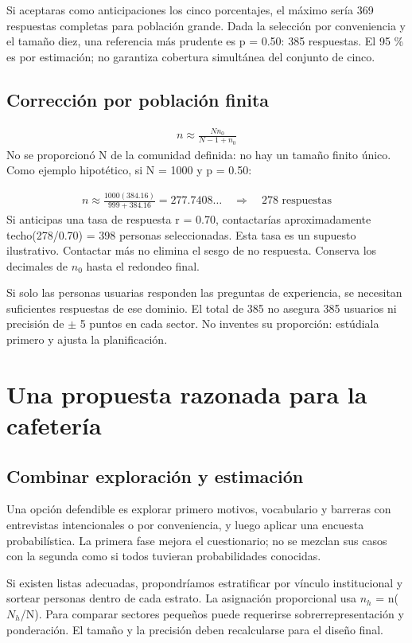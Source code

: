 \documentclass[11pt,letterpaper]{article}
\begin{document}
Si aceptaras como anticipaciones los cinco porcentajes, el máximo sería 369 respuestas completas para población grande. Dada la selección por conveniencia y el tamaño diez, una referencia más prudente es p = 0.50: 385 respuestas. El 95 \% es por estimación; no garantiza cobertura simultánea del conjunto de cinco.

\subsection{Corrección por población finita}
\begin{gather*}n\approx\frac{Nn_0}{N-1+n_0}\end{gather*}
No se proporcionó N de la comunidad definida: no hay un tamaño finito único. Como ejemplo hipotético, si N = 1000 y p = 0.50:

\begin{gather*}n\approx\frac{1000(384.16)}{999+384.16}=277.7408\ldots\quad\Rightarrow\quad278\text{ respuestas}\end{gather*}
Si anticipas una tasa de respuesta r = 0.70, contactarías aproximadamente techo(278/0.70) = 398 personas seleccionadas. Esta tasa es un supuesto ilustrativo. Contactar más no elimina el sesgo de no respuesta. Conserva los decimales de \(n_0\) hasta el redondeo final.

Si solo las personas usuarias responden las preguntas de experiencia, se necesitan suficientes respuestas de ese dominio. El total de 385 no asegura 385 usuarios ni precisión de  $\pm$ 5 puntos en cada sector. No inventes su proporción: estúdiala primero y ajusta la planificación.

\clearpage
\section{Una propuesta razonada para la cafetería}
\subsection{Combinar exploración y estimación}
Una opción defendible es explorar primero motivos, vocabulario y barreras con entrevistas intencionales o por conveniencia, y luego aplicar una encuesta probabilística. La primera fase mejora el cuestionario; no se mezclan sus casos con la segunda como si todos tuvieran probabilidades conocidas.

Si existen listas adecuadas, propondríamos estratificar por vínculo institucional y sortear personas dentro de cada estrato. La asignación proporcional usa \(n_h\) = n(\(N_h\)/N). Para comparar sectores pequeños puede requerirse sobrerrepresentación y ponderación. El tamaño y la precisión deben recalcularse para el diseño final.
\end{document}
